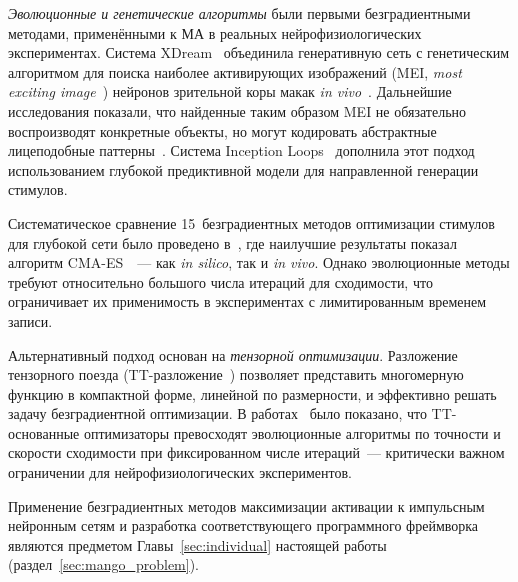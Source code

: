 \textit{Эволюционные и генетические алгоритмы} были первыми безградиентными методами, применёнными к МА в реальных нейрофизиологических экспериментах. Система XDream~\cite{XDream} объединила генеративную сеть с генетическим алгоритмом для поиска наиболее активирующих изображений (MEI, \textit{most exciting image}~\cite{Inception-what-excites-neurons-most}) нейронов зрительной коры макак \textit{in vivo}~\cite{ponce2019evolving}. Дальнейшие исследования показали, что найденные таким образом MEI не обязательно воспроизводят конкретные объекты, но могут кодировать абстрактные лицеподобные паттерны~\cite{bardon2022face}. Система Inception Loops~\cite{Inception-what-excites-neurons-most} дополнила этот подход использованием глубокой предиктивной модели для направленной генерации стимулов.

Систематическое сравнение 15~безградиентных методов оптимизации стимулов для глубокой сети было проведено в~\cite{wang2022high}, где наилучшие результаты показал алгоритм CMA-ES~\cite{CMA}~--- как \textit{in silico}, так и \textit{in vivo}. Однако эволюционные методы требуют относительно большого числа итераций для сходимости, что ограничивает их применимость в экспериментах с лимитированным временем записи.

Альтернативный подход основан на \textit{тензорной оптимизации}. Разложение тензорного поезда (TT-разложение~\cite{TT-Oseledets}) позволяет представить многомерную функцию в компактной форме, линейной по размерности, и эффективно решать задачу безградиентной оптимизации. В работах~\cite{TTOpt-paper, PROTES-Chertkov-paper} было показано, что TT-основанные оптимизаторы превосходят эволюционные алгоритмы по точности и скорости сходимости при фиксированном числе итераций~--- критически важном ограничении для нейрофизиологических экспериментов.

Применение безградиентных методов максимизации активации к импульсным нейронным сетям и разработка соответствующего программного фреймворка являются предметом Главы~\ref{sec:individual} настоящей работы (раздел~\ref{sec:mango_problem}).
